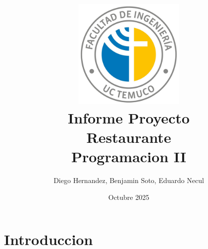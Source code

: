 \documentclass{article}
\title {\includegraphics[width=0.4\textwidth]{Ing_Uni.jpg}\\[2ex]{\textbf{Informe Proyecto\\ Restaurante}\\[1.5ex] Programacion II\\[20ex]}}
\author{Diego Hernandez, Benjamin Soto, Eduardo Necul}
\date{Octubre 2025}
\begin{document}
\maketitle
\newpage

\section{Introduccion}

\newpage
\end{document}

